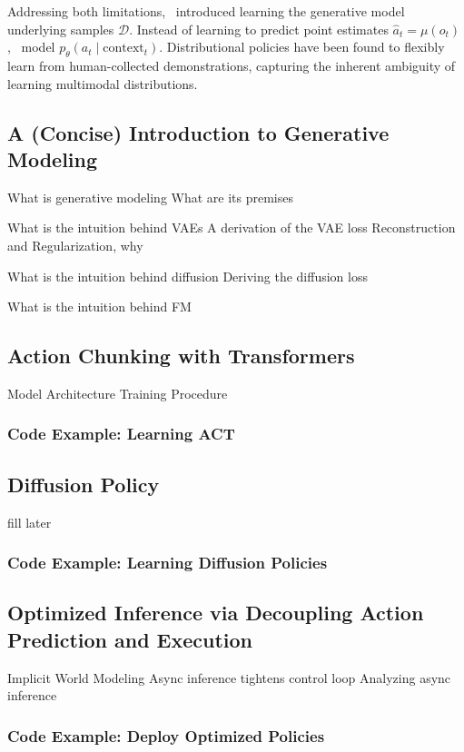 Addressing both limitations,~\citet{florenceImplicitBehavioralCloning2022} introduced learning the generative model underlying samples \( \mathcal D \).
Instead of learning to predict point estimates \( \hat a_t = \mu(o_t) \),~\citet{florenceImplicitBehavioralCloning2022}  model \( p_\theta(a_t \mid \text{context}_t) \).
Distributional policies have been found to flexibly learn from human-collected demonstrations, capturing the inherent ambiguity of learning multimodal distributions.


\subsection{A (Concise) Introduction to Generative Modeling}

What is generative modeling
What are its premises

What is the intuition behind VAEs
A derivation of the VAE loss
Reconstruction and Regularization, why

What is the intuition behind diffusion
Deriving the diffusion loss

What is the intuition behind FM


\subsection{Action Chunking with Transformers}
Model Architecture
Training Procedure

\subsubsection{Code Example: Learning ACT}

\subsection{Diffusion Policy}
fill later

\subsubsection{Code Example: Learning Diffusion Policies}

\subsection{Optimized Inference via Decoupling Action Prediction and Execution}
Implicit World Modeling 
Async inference tightens control loop
Analyzing async inference

\subsubsection{Code Example: Deploy Optimized Policies}
